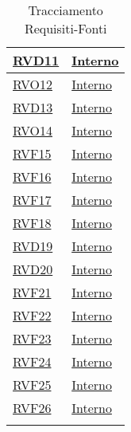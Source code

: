 \begin{longtable}{|>{\centering}m{5cm}|m{5cm}<{\centering}|}
\hyperlink{RVD11}{RVD11} & \hyperlink{Interno}{Interno}\\ \hline

\hyperlink{RVO12}{RVO12} & \hyperlink{Interno}{Interno}\\ \hline

\hyperlink{RVD13}{RVD13} & \hyperlink{Interno}{Interno}\\ \hline

\hyperlink{RVO14}{RVO14} & \hyperlink{Interno}{Interno}\\ \hline

\hyperlink{RVF15}{RVF15} & \hyperlink{Interno}{Interno}\\ \hline

\hyperlink{RVF16}{RVF16} & \hyperlink{Interno}{Interno}\\ \hline

\hyperlink{RVF17}{RVF17} & \hyperlink{Interno}{Interno}\\ \hline

\hyperlink{RVF18}{RVF18} & \hyperlink{Interno}{Interno}\\ \hline

\hyperlink{RVD19}{RVD19} & \hyperlink{Interno}{Interno}\\ \hline

\hyperlink{RVD20}{RVD20} & \hyperlink{Interno}{Interno}\\ \hline

\hyperlink{RVF21}{RVF21} & \hyperlink{Interno}{Interno}\\ \hline

\hyperlink{RVF22}{RVF22} & \hyperlink{Interno}{Interno}\\ \hline

\hyperlink{RVF23}{RVF23} & \hyperlink{Interno}{Interno}\\ \hline

\hyperlink{RVF24}{RVF24} & \hyperlink{Interno}{Interno}\\ \hline

\hyperlink{RVF25}{RVF25} & \hyperlink{Interno}{Interno}\\ \hline

\hyperlink{RVF26}{RVF26} & \hyperlink{Interno}{Interno}\\ \hline

\caption[Tracciamento Requisiti-Fonti]{Tracciamento Requisiti-Fonti}
\label{tabella:requi-fonti}
\end{longtable}
\clearpage
